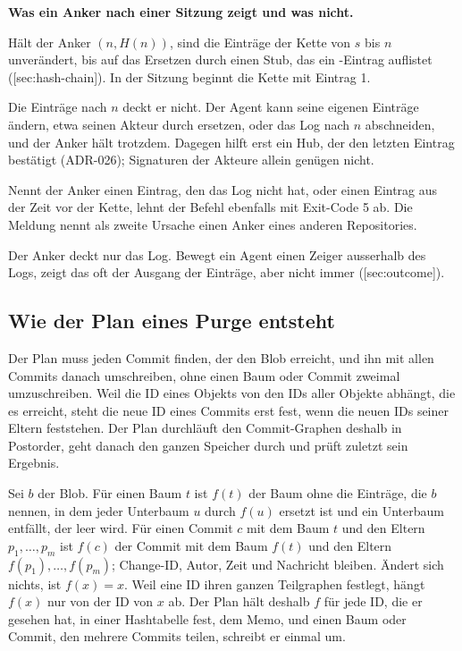 {\startinfobox
{\bf Was ein Anker nach einer Sitzung zeigt und was nicht.}
\startitemize
\item Hält der Anker $(n, H(n))$, sind die Einträge der Kette von $s$ bis $n$ unverändert,
bis auf das Ersetzen durch einen Stub, das ein -Eintrag auflistet
([sec:hash-chain]).
In der Sitzung beginnt die Kette mit Eintrag 1.
\item Die Einträge nach $n$ deckt er nicht.
Der Agent kann seine eigenen Einträge ändern,
etwa seinen Akteur durch  ersetzen,
oder das Log nach $n$ abschneiden, und der Anker hält trotzdem.
Dagegen hilft erst ein Hub, der den letzten Eintrag bestätigt (ADR-026);
Signaturen der Akteure allein genügen nicht.
\item Nennt der Anker einen Eintrag, den das Log nicht hat,
oder einen Eintrag aus der Zeit vor der Kette, lehnt der Befehl ebenfalls mit Exit-Code 5 ab.
Die Meldung nennt als zweite Ursache einen Anker eines anderen Repositories.
\item Der Anker deckt nur das Log.
Bewegt ein Agent einen Zeiger ausserhalb des Logs,
zeigt das oft der Ausgang der Einträge, aber nicht immer
([sec:outcome]).
\stopitemize
\stopinfobox

\subsection[sec:purge-plan]{Wie der Plan eines Purge entsteht}

Der Plan muss jeden Commit finden, der den Blob erreicht,
und ihn mit allen Commits danach umschreiben, ohne einen Baum oder Commit zweimal umzuschreiben.
Weil die ID eines Objekts von den IDs aller Objekte abhängt, die es erreicht,
steht die neue ID eines Commits erst fest, wenn die neuen IDs seiner Eltern feststehen.
Der Plan durchläuft den Commit-Graphen deshalb in Postorder,
geht danach den ganzen Speicher durch und prüft zuletzt sein Ergebnis.

Sei $b$ der Blob.
Für einen Baum $t$ ist $f(t)$ der Baum ohne die Einträge, die $b$ nennen,
in dem jeder Unterbaum $u$ durch $f(u)$ ersetzt ist und ein Unterbaum entfällt, der leer wird.
Für einen Commit $c$ mit dem Baum $t$ und den Eltern $p_1, \ldots, p_m$ ist $f(c)$ der Commit
mit dem Baum $f(t)$ und den Eltern $f(p_1), \ldots, f(p_m)$;
Change-ID, Autor, Zeit und Nachricht bleiben.
Ändert sich nichts, ist $f(x) = x$.
Weil eine ID ihren ganzen Teilgraphen festlegt, hängt $f(x)$ nur von der ID von $x$ ab.
Der Plan hält deshalb $f$ für jede ID, die er gesehen hat, in einer Hashtabelle fest,
dem Memo, und einen Baum oder Commit, den mehrere Commits teilen, schreibt er einmal um.

}
